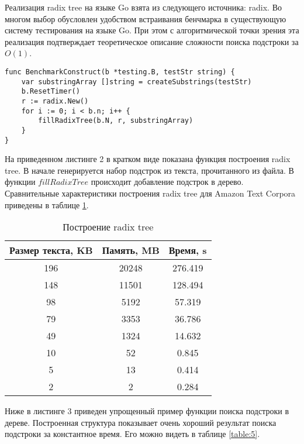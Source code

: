 Реализация radix tree на языке Go взята из следующего источника: radix.
Во многом выбор обусловлен удобством встраивания бенчмарка в существующую систему тестирования на языке Go.
При этом с алгоритмической точки зрения эта реализация подтверждает
теоретическое описание сложности поиска подстроки за $O(1)$.
\newpage
\begin{lstlisting}[caption=Radix tree example]
func BenchmarkConstruct(b *testing.B, testStr string) {
	var substringArray []string = createSubstrings(testStr)
	b.ResetTimer()
	r := radix.New()
	for i := 0; i < b.n; i++ {
		fillRadixTree(b.N, r, substringArray)
	}
}
\end{lstlisting}

На приведенном листинге 2 в кратком виде показана функция построения radix tree.
В начале генерируется набор подстрок из текста, прочитанного из файла. В функции $fillRadixTree$
происходит добавление подстрок в дерево. Сравнительные характеристики построения radix tree
для Amazon Text Corpora приведены в таблице \ref{table:4}.


\begin{table}[h!]
    \centering
    \begin{tabular}{|c|c|c|}
        \hline
        Размер текста, KB & Память, MB & Время, s\\
        \hline
        196 & 20248 & 276.419\\
        \hline
        148 & 11501 & 128.494\\
        \hline
        98 & 5192 & 57.319\\
        \hline
        79 & 3353 & 36.786\\
        \hline
        49 & 1324 & 14.632\\
        \hline
        10 & 52 & 0.845\\
        \hline
        5 & 13 & 0.414\\
        \hline
        2 & 2 & 0.284\\
        \hline
    \end{tabular}
    \caption{Построение radix tree}
    \label{table:4}
\end{table}

Ниже в листинге 3 приведен упрощенный пример функции поиска подстроки в дереве.
Построенная структура показывает очень хороший результат поиска подстроки за константное время.
Его можно видеть в таблице \ref{table:5}.

